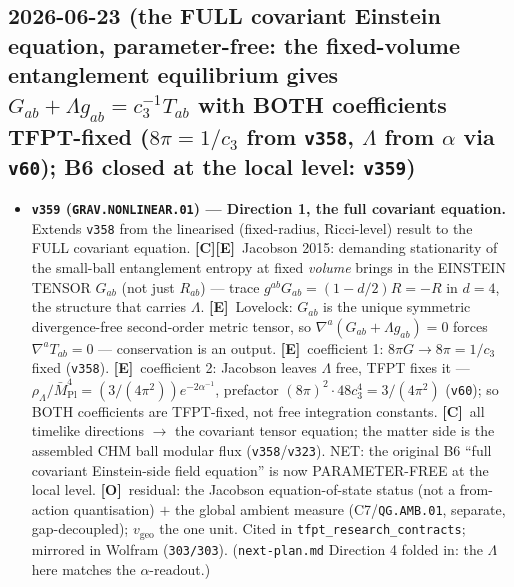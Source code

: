 \documentclass[11pt]{article}
\providecommand{\mE}{\textbf{[E]}}\providecommand{\mC}{\textbf{[C]}}
\providecommand{\mO}{\textbf{[O]}}\providecommand{\mX}{\textbf{[X]}}
\providecommand{\vref}[1]{\texttt{#1}}
\providecommand{\cthree}{c_3}\providecommand{\phiz}{\varphi_0^{\mathrm{ret}}}
\providecommand{\Mbar}{\bar M_{\mathrm{Pl}}}\providecommand{\Z}{\mathbb{Z}}\providecommand{\PP}{\mathbb{P}}
\begin{document}
\subsection*{2026-06-23 (the FULL covariant Einstein equation, parameter-free: the fixed-volume entanglement equilibrium gives $G_{ab}+\Lambda g_{ab}=\cthree^{-1}T_{ab}$ with BOTH coefficients TFPT-fixed ($8\pi=1/\cthree$ from \texttt{v358}, $\Lambda$ from $\alpha$ via \texttt{v60}); B6 closed at the local level: \texttt{v359})}
\begin{itemize}
\item \textbf{\texttt{v359} (\texttt{GRAV.NONLINEAR.01}) --- Direction 1, the full covariant equation.} Extends \vref{v358}
from the linearised (fixed-radius, Ricci-level) result to the FULL covariant equation. \mC\mE\ Jacobson 2015: demanding
stationarity of the small-ball entanglement entropy at fixed \emph{volume} brings in the EINSTEIN TENSOR $G_{ab}$
(not just $R_{ab}$) --- trace $g^{ab}G_{ab}=(1-d/2)R=-R$ in $d{=}4$, the structure that carries $\Lambda$. \mE\
Lovelock: $G_{ab}$ is the unique symmetric divergence-free second-order metric tensor, so $\nabla^a(G_{ab}+\Lambda
g_{ab})=0$ forces $\nabla^a T_{ab}=0$ --- conservation is an output. \mE\ coefficient 1: $8\pi G\to 8\pi=1/\cthree$
fixed (\vref{v358}). \mE\ coefficient 2: Jacobson leaves $\Lambda$ free, TFPT fixes it ---
$\rho_\Lambda/\Mbar^4=(3/(4\pi^2))e^{-2\alpha^{-1}}$, prefactor $(8\pi)^2{\cdot}48\cthree^4=3/(4\pi^2)$ (\vref{v60}); so
BOTH coefficients are TFPT-fixed, not free integration constants. \mC\ all timelike directions $\to$ the covariant
tensor equation; the matter side is the assembled CHM ball modular flux (\vref{v358}/\vref{v323}). NET: the original B6
``full covariant Einstein-side field equation'' is now PARAMETER-FREE at the local level. \mO\ residual: the Jacobson
equation-of-state status (not a from-action quantisation) $+$ the global ambient measure (C7/\texttt{QG.AMB.01},
separate, gap-decoupled); $v_{\mathrm{geo}}$ the one unit. Cited in \texttt{tfpt\_research\_contracts}; mirrored in
Wolfram (\texttt{303/303}). (\texttt{next-plan.md} Direction 4 folded in: the $\Lambda$ here matches the $\alpha$-readout.)
\end{itemize}
\end{document}
